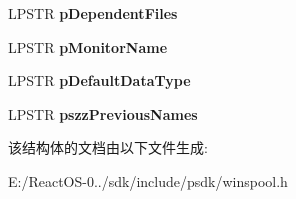 \begin{DoxyCompactItemize}
L\+P\+S\+TR {\bfseries p\+Dependent\+Files}
\item 
\mbox{\label{struct___d_r_i_v_e_r___i_n_f_o__4_a_a33a276a74af6e85b60b751fa7f6da2e2}} 
L\+P\+S\+TR {\bfseries p\+Monitor\+Name}
\item 
\mbox{\label{struct___d_r_i_v_e_r___i_n_f_o__4_a_a88771aeb98aba455d4a3b682d8acdae2}} 
L\+P\+S\+TR {\bfseries p\+Default\+Data\+Type}
\item 
\mbox{\label{struct___d_r_i_v_e_r___i_n_f_o__4_a_a985c1760d82329b1366f94956d9a2c43}} 
L\+P\+S\+TR {\bfseries pszz\+Previous\+Names}
\end{DoxyCompactItemize}


该结构体的文档由以下文件生成\+:\begin{DoxyCompactItemize}
\item 
E\+:/\+React\+O\+S-\/0../sdk/include/psdk/winspool.\+h\end{DoxyCompactItemize}

